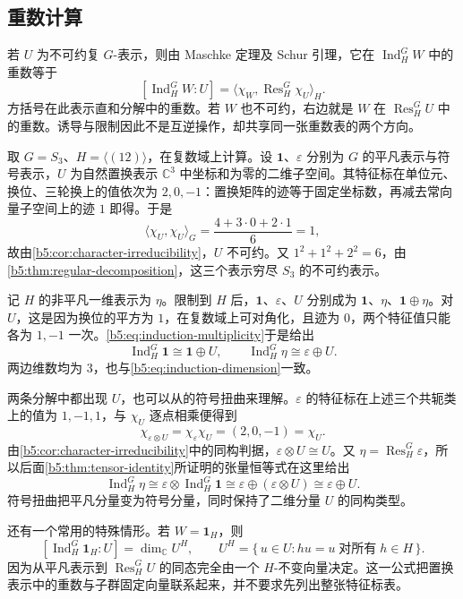 \subsection{重数计算}
\label{b5:subsec:0302:03}

若 \(U\) 为不可约复 \(G\)-表示，则由 Maschke 定理及 Schur 引理，它在 \(\operatorname{Ind}_H^G W\) 中的重数等于
\begin{equation}\label{b5:eq:induction-multiplicity}
	[\operatorname{Ind}_H^G W:U] =\langle\chi_W,\operatorname{Res}_H^G\chi_U\rangle_H.
\end{equation}
方括号在此表示直和分解中的重数。若 \(W\) 也不可约，右边就是 \(W\) 在 \(\operatorname{Res}_H^G U\) 中的重数。诱导与限制因此不是互逆操作，却共享同一张重数表的两个方向。

\begin{example}\label{b5:exm:s3-transposition-induction}
	取 \(G=S_3\)、\(H=\bigl\langle(12)\bigr\rangle\)，在复数域上计算。设 \(\mathbf1\)、\(\varepsilon\) 分别为 \(G\) 的平凡表示与符号表示，\(U\) 为自然置换表示 \(\mathbb C^3\) 中坐标和为零的二维子空间。其特征标在单位元、换位、三轮换上的值依次为 \(2,0,-1\)：置换矩阵的迹等于固定坐标数，再减去常向量子空间上的迹 \(1\) 即得。于是
	\[
		\langle\chi_U,\chi_U\rangle_G =\frac{4+3\cdot0+2\cdot1}{6}=1,
	\]
	故由\cref{b5:cor:character-irreducibility}，\(U\) 不可约。又 \(1^2+1^2+2^2=6\)，由\cref{b5:thm:regular-decomposition}，这三个表示穷尽 \(S_3\) 的不可约表示。

	\ProseParagraphBreak
	记 \(H\) 的非平凡一维表示为 \(\eta\)。限制到 \(H\) 后，\(\mathbf1\)、\(\varepsilon\)、\(U\) 分别成为 \(\mathbf1\)、\(\eta\)、\(\mathbf1\oplus\eta\)。对 \(U\)，这是因为换位的平方为 \(1\)，在复数域上可对角化，且迹为 \(0\)，两个特征值只能各为 \(1,-1\) 一次。\eqref{b5:eq:induction-multiplicity}于是给出
	\[
		\operatorname{Ind}_H^G\mathbf1\cong\mathbf1\oplus U, \qquad \operatorname{Ind}_H^G\eta\cong\varepsilon\oplus U.
	\]
	两边维数均为 \(3\)，也与\eqref{b5:eq:induction-dimension}一致。

	\ProseParagraphBreak
	两条分解中都出现 \(U\)，也可以从的符号扭曲来理解。\(\varepsilon\) 的特征标在上述三个共轭类上的值为 \(1,-1,1\)，与 \(\chi_U\) 逐点相乘便得到
	\[
		\chi_{\varepsilon\otimes U}=\chi_\varepsilon\chi_U =(2,0,-1)=\chi_U.
	\]
	由\cref{b5:cor:character-irreducibility}中的同构判据，\(\varepsilon\otimes U\cong U\)。又 \(\eta=\operatorname{Res}_H^G\varepsilon\)，所以后面\cref{b5:thm:tensor-identity}所证明的张量恒等式在这里给出
	\[
		\operatorname{Ind}_H^G\eta \cong\varepsilon\otimes\operatorname{Ind}_H^G\mathbf1 \cong\varepsilon\oplus(\varepsilon\otimes U) \cong\varepsilon\oplus U.
	\]
	符号扭曲把平凡分量变为符号分量，同时保持了二维分量 \(U\) 的同构类型。
\end{example}

还有一个常用的特殊情形。若 \(W=\mathbf1_H\)，则
\[
	[\operatorname{Ind}_H^G\mathbf1_H:U] =\dim_{\mathbb C} U^H, \qquad U^H=\{\,u\in U:hu=u\;\text{对所有}\;h\in H\,\}.
\]
因为从平凡表示到 \(\operatorname{Res}_H^G U\) 的同态完全由一个 \(H\)-不变向量决定。这一公式把置换表示中的重数与子群固定向量联系起来，并不要求先列出整张特征标表。
